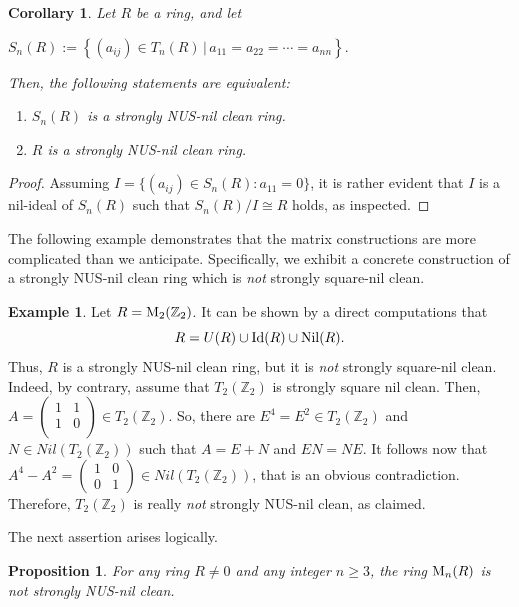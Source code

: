 \documentclass[12pt]{amsart}
\newtheorem{proposition}[theorem]{Proposition}
\newtheorem{corollary}[theorem]{Corollary}
\theoremstyle{definition}
\newtheorem{example}[theorem]{Example}
\begin{document}
\begin{corollary}\label{2.57}
Let $R$ be a ring, and let
\begin{center}
$S_{n}(R):=\left\lbrace (a_{ij})\in T_{n}(R)\, | \, a_{11}=a_{22}=\cdots=a_{nn}\right\rbrace.$
\end{center}
Then, the following statements are equivalent:
\begin{enumerate}
\item	
$S_{n}(R)$ is a strongly NUS-nil clean ring.
\item	
$R$ is a strongly NUS-nil clean ring.
\end{enumerate}
\end{corollary}

\begin{proof}	
Assuming $I=\{(a_{ij}) \in S_n(R) : a_{11}=0\}$, it is rather evident that $I$ is a nil-ideal of $S_n(R)$ such that $S_n(R)/I \cong R$ holds, as inspected.
\end{proof}

The following example demonstrates that the matrix constructions are more complicated than we anticipate. Specifically, we exhibit a concrete construction of a strongly NUS-nil clean ring which is {\it not} strongly square-nil clean.

\begin{example}\label{2.24}
Let $R={\rm M}_2(\mathbb{Z}_2)$. It can be shown by a direct computations that $$R = U(R) \cup {\rm Id}(R) \cup {\rm Nil}(R).$$ Thus, $R$ is a strongly NUS-nil clean ring, but it is {\it not} strongly square-nil clean. Indeed, by contrary, assume that $T_2(\mathbb{Z}_2)$ is strongly square nil clean. Then, $A=\begin{pmatrix}
		1 & 1  \\
		1 & 0 \\
	\end{pmatrix} \in T_2(\mathbb{Z}_2)$. So, there are $E^4=E^2\in T_2(\mathbb{Z}_2)$ and $N\in Nil(T_2(\mathbb{Z}_2))$ such that $A=E+N$ and $EN=NE$. It follows now that $A^4-A^2=\begin{pmatrix}
		1 & 0 \\
		0 & 1
	\end{pmatrix}\in Nil(T_2(\mathbb{Z}_2))$, that is an obvious contradiction. Therefore, $T_2(\mathbb{Z}_2)$ is really {\it not} strongly NUS-nil clean, as claimed.
\end{example}

The next assertion arises logically.

\begin{proposition}\label{2.25}
For any ring $R \neq 0$ and any integer $n \ge 3$, the ring ${\rm M}_n(R)$ is not strongly NUS-nil clean.
\end{proposition}
\end{document}
